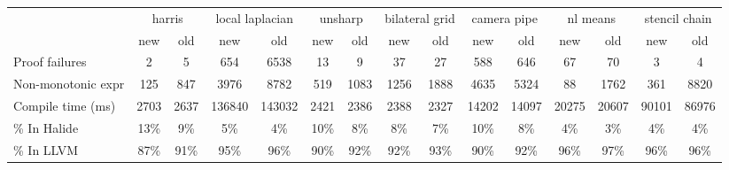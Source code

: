 ﻿%
\begin{tabular}{l|cc|cc|cc|cc|cc|cc|cc|}
& \multicolumn{2}{c|}{harris}  & \multicolumn{2}{c|}{local laplacian}  & \multicolumn{2}{c|}{unsharp}  & \multicolumn{2}{c|}{bilateral grid}  & \multicolumn{2}{c|}{camera pipe}  & \multicolumn{2}{c|}{nl means}  & \multicolumn{2}{c|}{stencil chain}  \\
& new & old & new & old & new & old & new & old & new & old & new & old & new & old\\
Proof failures & 2 & 5 & 654 & 6538 & 13 & 9 & 37 & 27 & 588 & 646 & 67 & 70 & 3 & 4\\
Non-monotonic expr & 125 & 847 & 3976 & 8782 & 519 & 1083 & 1256 & 1888 & 4635 & 5324 & 88 & 1762 & 361 & 8820\\\hline
Compile time (ms) & 2703 & 2637 & 136840 & 143032 & 2421 & 2386 & 2388 & 2327 & 14202 & 14097 & 20275 & 20607 & 90101 & 86976\\
\% In Halide & 13\% & 	9\% & 	5\% & 	4\% & 	10\% & 	8\% & 	8\% & 	7\% & 	10\% & 	8\% & 	4\% & 	3\% & 	4\% & 	4\%\\
\% In LLVM & 87\% & 	91\% & 	95\% & 	96\% & 	90\% & 	92\% & 	92\% & 	93\% & 	90\% & 	92\% & 	96\% & 	97\% & 	96\% & 	96\%\\
\end{tabular}
